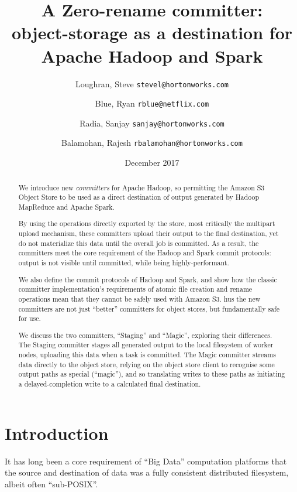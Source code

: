 \documentclass[conference]{IEEEtran}
\title{
A Zero-rename committer:\\
object-storage as a destination for Apache Hadoop and Spark}
\author{
  Loughran, Steve
  \texttt{stevel@hortonworks.com}\\
\and
  Blue, Ryan
  \texttt{rblue@netflix.com}\\
\and
  Radia, Sanjay
  \texttt{sanjay@hortonworks.com} \\
\and
  Balamohan, Rajesh
  \texttt{rbalamohan@hortonworks.com} \\
}
\date{December 2017}
\begin{document}
\maketitle


\begin{abstract}

We introduce new \emph{committers} for Apache Hadoop, so permitting
the Amazon S3 Object Store to be used as a direct destination of output generated
by Hadoop MapReduce and Apache Spark.

By using the operations directly exported by
the store, most critically the multipart upload mechanism, these committers upload
their output to the final destination, yet do not materialize this data until the
overall job is committed.
As a result, the committers meet the core requirement of the Hadoop and Spark commit
protocols: output is not visible until committed, while being highly-performant.

We also define the commit protocols of Hadoop and Spark, and show how the classic committer
implementation's requirements of atomic file creation and rename operations mean that they
cannot be safely used with Amazon S3.
hus the new committers are not just ``better'' committers for object stores,
but fundamentally safe for use.

We discuss the two committers, ``Staging'' and ``Magic'', exploring their differences.
The Staging committer stages all generated output to the local filesystem of
worker nodes, uploading this data when a task is committed.
The Magic committer streams data directly to the object store, relying on the
object store client to recognise some output paths as special (``magic''), and
so translating writes to these paths as initiating a delayed-completion write
to a calculated final destination.

\end{abstract}


\section{Introduction}
\label{sec:introduction}

It has long been a core requirement of ``Big Data'' computation platforms that
the source and destination of data was a fully consistent distributed filesystem,
albeit often ``sub-POSIX''.
\end{document}
